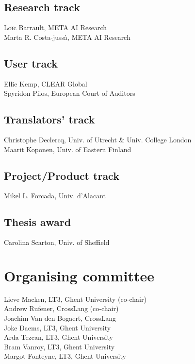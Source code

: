 \documentclass[a4paper,11pt,twoside]{book}
\begin{document}
\subsection*{Research track}
\noindent Loïc Barrault, META AI Research\\
\noindent Marta R. Costa-jussà, META AI Research

\subsection*{User track}
\noindent Ellie Kemp, CLEAR Global\\
\noindent Spyridon Pilos, European Court of Auditors

\subsection*{Translators' track}
\noindent Christophe Declercq, Univ. of Utrecht \&
Univ. College London\\
\noindent Maarit Koponen, Univ. of Eastern Finland

\subsection*{Project/Product track}
\noindent Mikel L. Forcada, Univ. d'Alacant

\subsection*{Thesis award}
\noindent Carolina Scarton, Univ. of Sheffield

\section*{Organising committee}
\noindent Lieve Macken, LT3, Ghent University (co-chair)\\
\noindent Andrew Rufener, CrossLang (co-chair)\\
\noindent Joachim Van den Bogaert, CrossLang\\
\noindent Joke Daems, LT3, Ghent University\\
\noindent Arda Tezcan, LT3, Ghent University\\
\noindent Bram Vanroy, LT3, Ghent University\\
\noindent Margot Fonteyne, LT3, Ghent University\\



\pagebreak
\end{document}
